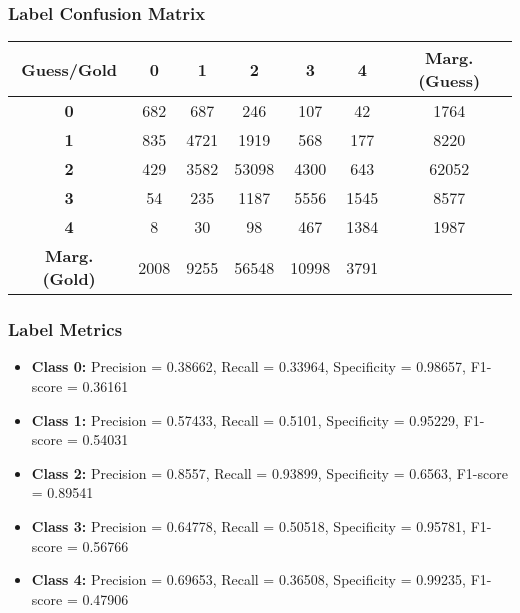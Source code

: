 \subsubsection{Label Confusion Matrix}
\begin{table}[h]
\centering
\begin{tabular}{c|ccccc|c}
\textbf{Guess/Gold} & \textbf{0} & \textbf{1} & \textbf{2} & \textbf{3} & \textbf{4} & \textbf{Marg. (Guess)} \\
\hline
\textbf{0} & 682 & 687 & 246 & 107 & 42 & 1764 \\
\textbf{1} & 835 & 4721 & 1919 & 568 & 177 & 8220 \\
\textbf{2} & 429 & 3582 & 53098 & 4300 & 643 & 62052 \\
\textbf{3} & 54 & 235 & 1187 & 5556 & 1545 & 8577 \\
\textbf{4} & 8 & 30 & 98 & 467 & 1384 & 1987 \\
\hline
\textbf{Marg. (Gold)} & 2008 & 9255 & 56548 & 10998 & 3791 & \\
\end{tabular}
\end{table}

\subsubsection{Label Metrics}
\begin{itemize}
    \item \textbf{Class 0:} Precision = 0.38662, Recall = 0.33964, Specificity = 0.98657, F1-score = 0.36161
    \item \textbf{Class 1:} Precision = 0.57433, Recall = 0.5101, Specificity = 0.95229, F1-score = 0.54031
    \item \textbf{Class 2:} Precision = 0.8557, Recall = 0.93899, Specificity = 0.6563, F1-score = 0.89541
    \item \textbf{Class 3:} Precision = 0.64778, Recall = 0.50518, Specificity = 0.95781, F1-score = 0.56766
    \item \textbf{Class 4:} Precision = 0.69653, Recall = 0.36508, Specificity = 0.99235, F1-score = 0.47906
\end{itemize}


